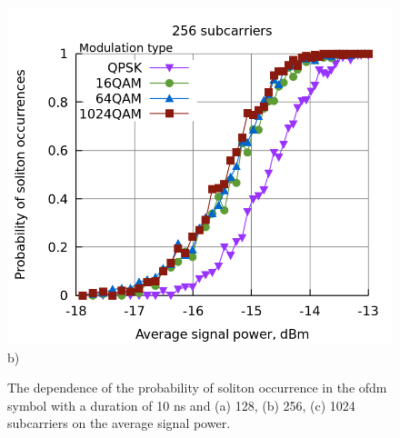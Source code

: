 \begin{figure}[htpb]
\begin{minipage}[h]{0.47\linewidth}
{            \includegraphics[width=1\linewidth]{images/soliton/10ns_ofdm_prob_256.png} b) \\
        }
    \end{minipage}
    \vfill

    \caption{The dependence of the probability of soliton occurrence in the \acrshort{ofdm} symbol with a duration of 10 ns and (a) 128, (b) 256, (c) 1024 subcarriers on the average signal power.}
    \label{fig:ofdm_result_sub_all}
\end{figure}

